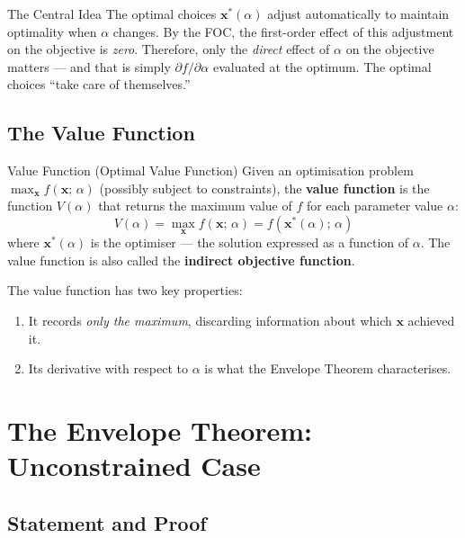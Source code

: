 \documentclass[12pt, a4paper]{article}
\theoremstyle{definition}
\newcommand{\bx}{\mathbf{x}}
\begin{document}
\begin{keybox}{The Central Idea}
The optimal choices $\bx^*(\alpha)$ adjust automatically to maintain
optimality when $\alpha$ changes. By the FOC, the first-order effect of this
adjustment on the objective is \emph{zero}. Therefore, only the \emph{direct}
effect of $\alpha$ on the objective matters --- and that is simply
$\partial f / \partial\alpha$ evaluated at the optimum. The optimal choices
``take care of themselves.''
\end{keybox}
\newpage
\subsection{The Value Function}

\begin{defbox}{Value Function (Optimal Value Function)}
Given an optimisation problem $\max_{\bx} f(\bx;\,\alpha)$ (possibly
subject to constraints), the \textbf{value function} is the function
$V(\alpha)$ that returns the maximum value of $f$ for each parameter value
$\alpha$:
\[
  V(\alpha)
  = \max_{\bx} f(\bx;\,\alpha)
  = f\!\left(\bx^*(\alpha);\,\alpha\right)
\]
where $\bx^*(\alpha)$ is the optimiser --- the solution expressed as a
function of $\alpha$. The value function is also called the \textbf{indirect
objective function}.
\end{defbox}

The value function has two key properties:
\begin{enumerate}
  \item It records \emph{only the maximum}, discarding information about
        which $\bx$ achieved it.
  \item Its derivative with respect to $\alpha$ is what the Envelope
        Theorem characterises.
\end{enumerate}

\section{The Envelope Theorem: Unconstrained Case}

\subsection{Statement and Proof}
\end{document}
